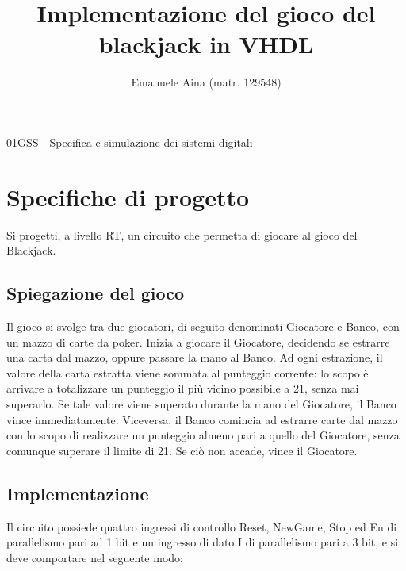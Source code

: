 \documentclass [11pt,a4paper,oneside]{article}
\title{Implementazione del gioco del blackjack in VHDL}
\author{Emanuele Aina (matr. 129548)}
\date{}
\begin{document}
\maketitle

\begin{center}
\small{01GSS - Specifica e simulazione dei sistemi digitali}
\end{center}

\section{Specifiche di progetto}
Si progetti, a livello RT, un circuito che permetta di giocare al gioco del Blackjack.

\subsection{Spiegazione del gioco}
Il gioco si svolge tra due giocatori, di seguito denominati
Giocatore e Banco, con un mazzo di carte da poker. Inizia a giocare il Giocatore,
decidendo se estrarre una carta dal mazzo, oppure passare la mano al Banco. Ad ogni
estrazione, il valore della carta estratta viene sommata al punteggio corrente: lo scopo
è arrivare a totalizzare un punteggio il più vicino possibile a 21, senza mai superarlo.
Se tale valore viene superato durante la mano del Giocatore, il Banco vince
immediatamente. Viceversa, il Banco comincia ad estrarre carte dal mazzo con lo
scopo di realizzare un punteggio almeno pari a quello del Giocatore, senza comunque
superare il limite di 21. Se ciò non accade, vince il Giocatore.

\subsection{Implementazione}
Il circuito possiede quattro ingressi di controllo Reset, NewGame,
Stop ed En di parallelismo pari ad 1 bit e un ingresso di dato I di parallelismo pari a
3 bit, e si deve comportare nel seguente modo:
\end{document}
